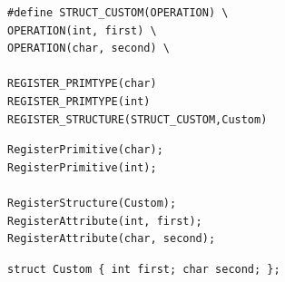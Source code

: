 \documentclass[report,11pt]{elsarticle}
\begin{document}
\begin{lstlisting}[frame=single,caption=Řešení v pseudokódu problematického použití operátoru "." v přiřazovacím výroku,label=lst:decUse1N]
#define STRUCT_CUSTOM(OPERATION) \
OPERATION(int, first) \
OPERATION(char, second) \

REGISTER_PRIMTYPE(char)
REGISTER_PRIMTYPE(int)
REGISTER_STRUCTURE(STRUCT_CUSTOM,Custom)
\end{lstlisting}

\begin{lstlisting}[frame=single,caption=Řešení v pseudokódu problematického použití operátoru "." v přiřazovacím výroku,label=lst:decUse2N]
RegisterPrimitive(char);
RegisterPrimitive(int);

RegisterStructure(Custom);
RegisterAttribute(int, first);
RegisterAttribute(char, second);
\end{lstlisting}

\begin{lstlisting}[frame=single,caption=Řešení v pseudokódu problematického použití operátoru "." v přiřazovacím výroku,label=lst:decUse3N]
struct Custom { int first; char second; };
\end{lstlisting}
 
\end{document}
